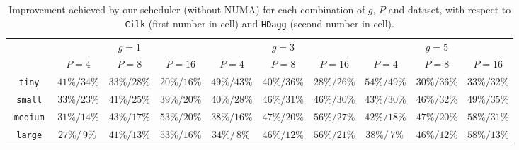 \documentclass[sigconf,nonacm]{acmart}
\begin{document}
\begin{table*}[t]
    \centering
      \caption{Improvement achieved by our scheduler (without NUMA) for each combination of $g$, $P$ and dataset, with respect to \texttt{Cilk} (first number in cell) and \texttt{HDagg} (second number in cell).}
    \renewcommand{\arraystretch}{1.55}
    \begin{tabular}{c || c | c | c | c | c | c | c | c | c | }
     & \multicolumn{3}{c}{$g=1$} & \multicolumn{3}{c}{$g=3$} & \multicolumn{3}{c}{$g=5$} \\ [0.5ex]
     & $P=4$ & $P=8$ & $P=16$ & $P=4$ & $P=8$ & $P=16$ & $P=4$ & $P=8$ & $P=16$ \\ [0.5ex] 
     \hline\hline
     $\!\!\!$ \texttt{tiny} $\!\!$ & \small $41\% / 34\%$  & \small $ 33\% / 28\%$ & \small $ 20\% / 16\%$ & \small $ 49\% / 43 \%$  & \small $ 40\% / 36 \%$ & \small $ 28\% / 26 \%$ & \small $54 \%  / 49 \%$  & \small $30 \%  / 36 \%$ & \small $ 33 \% / 32 \%$ \\ 
     \hline
     $\!\!\!$ \texttt{small} $\!\!$ & \small $33\% / 23\%$  & \small $41\% / 25\%$ & \small $39\% / 20\%$ & \small $40\% / 28\%$  & \small $46\% / 31\%$ & \small $46\% / 30\%$ & \small $43\% / 30\%$  & \small $46\% / 32\%$ & \small $49\% / 35\%$ \\
     \hline
     $\!\!\!\!\!$ \texttt{medium} $\!\!\!\!\!$ & \small $31\% / 14\%$  & \small $43\% / 17\%$ & \small $53\% / 20\%$ & \small $38\% / 16\%$  & \small $47\% / 20\%$ & \small $56\% / 27\%$ & \small $42\% / 18\%$  & \small $47\% / 20\%$ & \small $58\% / 31\%$ \\
     \hline
     $\!\!\!$ \texttt{large} $\!\!$ & \small $27\% / \,9\%\:$  & \small $41\% / 13\%$ & \small $53\% / 16\%$ & \small $34\% / \,8\%\:$  & \small $46\% / 12\%$ & \small $56\% / 21\%$ & \small $38\% / \,7\%\:$  & \small $46\% / 12\%$ & \small $58\% / 13\%$ \\
     \hline
    \end{tabular}
  \label{tab:main_app}
\end{table*}
\end{document}
